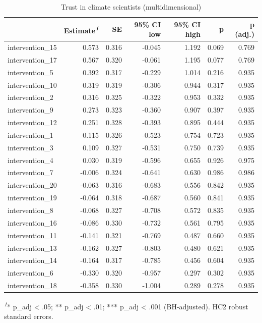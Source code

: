 \documentclass[
  letterpaper,
  DIV=11,
  numbers=noendperiod]{scrartcl}
\begin{document}
\begin{table}
{\caption*{
{\large Trust in climate scientists (multidimensional)}
} 
\fontsize{7.5pt}{9.0pt}\selectfont
\begin{tabular*}{\linewidth}{@{\extracolsep{\fill}}l|rrrrrr}
\toprule
 & Estimate\textsuperscript{\textit{1}} & SE & 95\% CI low & 95\% CI high & p & p (adj.) \\ 
\midrule\addlinespace[2.5pt]
intervention\_15 & 0.573 & 0.316 & -0.045 & 1.192 & 0.069 & 0.769 \\ 
intervention\_17 & 0.567 & 0.320 & -0.061 & 1.195 & 0.077 & 0.769 \\ 
intervention\_5 & 0.392 & 0.317 & -0.229 & 1.014 & 0.216 & 0.935 \\ 
intervention\_10 & 0.319 & 0.319 & -0.306 & 0.944 & 0.317 & 0.935 \\ 
intervention\_2 & 0.316 & 0.325 & -0.322 & 0.953 & 0.332 & 0.935 \\ 
intervention\_9 & 0.273 & 0.323 & -0.360 & 0.907 & 0.397 & 0.935 \\ 
intervention\_12 & 0.251 & 0.328 & -0.393 & 0.895 & 0.444 & 0.935 \\ 
intervention\_1 & 0.115 & 0.326 & -0.523 & 0.754 & 0.723 & 0.935 \\ 
intervention\_3 & 0.109 & 0.327 & -0.531 & 0.750 & 0.739 & 0.935 \\ 
intervention\_4 & 0.030 & 0.319 & -0.596 & 0.655 & 0.926 & 0.975 \\ 
intervention\_7 & -0.006 & 0.324 & -0.641 & 0.630 & 0.986 & 0.986 \\ 
intervention\_20 & -0.063 & 0.316 & -0.683 & 0.556 & 0.842 & 0.935 \\ 
intervention\_19 & -0.064 & 0.318 & -0.687 & 0.560 & 0.841 & 0.935 \\ 
intervention\_8 & -0.068 & 0.327 & -0.708 & 0.572 & 0.835 & 0.935 \\ 
intervention\_16 & -0.086 & 0.330 & -0.732 & 0.561 & 0.795 & 0.935 \\ 
intervention\_11 & -0.141 & 0.321 & -0.769 & 0.487 & 0.660 & 0.935 \\ 
intervention\_13 & -0.162 & 0.327 & -0.803 & 0.480 & 0.621 & 0.935 \\ 
intervention\_14 & -0.164 & 0.317 & -0.785 & 0.456 & 0.604 & 0.935 \\ 
intervention\_6 & -0.330 & 0.320 & -0.957 & 0.297 & 0.302 & 0.935 \\ 
intervention\_18 & -0.358 & 0.330 & -1.004 & 0.289 & 0.278 & 0.935 \\ 
\bottomrule
\end{tabular*}
\begin{minipage}{\linewidth}
\textsuperscript{\textit{1}}* p\_adj < .05; ** p\_adj < .01; *** p\_adj < .001 (BH-adjusted). HC2 robust standard errors.\\
\end{minipage}

}

\end{table}%
\end{document}

